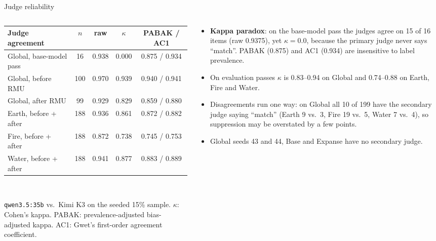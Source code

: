 \documentclass[aspectratio=169,11pt,usepdftitle=false]{beamer}
\newcommand{\code}[1]{\texttt{#1}}
\begin{document}
\begin{frame}{Judge reliability}
\begin{columns}[T]
\begin{column}{0.52\textwidth}
\scriptsize
\setlength{\tabcolsep}{3pt}
\begin{tabular}{@{}lcccc@{}}
\toprule
Judge agreement & $n$ & raw & $\kappa$ & PABAK / AC1\\
\midrule
Global, base-model pass & 16 & 0.938 & 0.000 & 0.875 / 0.934\\
Global, before RMU & 100 & 0.970 & 0.939 & 0.940 / 0.941\\
Global, after RMU & 99 & 0.929 & 0.829 & 0.859 / 0.880\\
Earth, before + after & 188 & 0.936 & 0.861 & 0.872 / 0.882\\
Fire, before + after & 188 & 0.872 & 0.738 & 0.745 / 0.753\\
Water, before + after & 188 & 0.941 & 0.877 & 0.883 / 0.889\\
\bottomrule
\end{tabular}\\[3pt]
{\tiny \code{qwen3.5:35b} vs.\ Kimi K3 on the seeded 15\% sample. $\kappa$: Cohen's kappa. PABAK: prevalence-adjusted bias-adjusted kappa. AC1: Gwet's first-order agreement coefficient.\par}
\end{column}
\begin{column}{0.46\textwidth}
\scriptsize
\begin{itemize}
\item \textbf{Kappa paradox}: on the base-model pass the judges agree on 15 of 16 items (raw 0.9375), yet $\kappa = 0.0$, because the primary judge never says ``match''. PABAK (0.875) and AC1 (0.934) are insensitive to label prevalence.
\item On evaluation passes $\kappa$ is 0.83--0.94 on Global and 0.74--0.88 on Earth, Fire and Water.
\item Disagreements run one way: on Global all 10 of 199 have the secondary judge saying ``match'' (Earth 9 vs.\ 3, Fire 19 vs.\ 5, Water 7 vs.\ 4), so suppression may be overstated by a few points.
\item Global seeds 43 and 44, Base and Expanse have no secondary judge.
\end{itemize}
\end{column}
\end{columns}
\note{
\begin{itemize}

\end{itemize}}
\end{frame}
\end{document}

